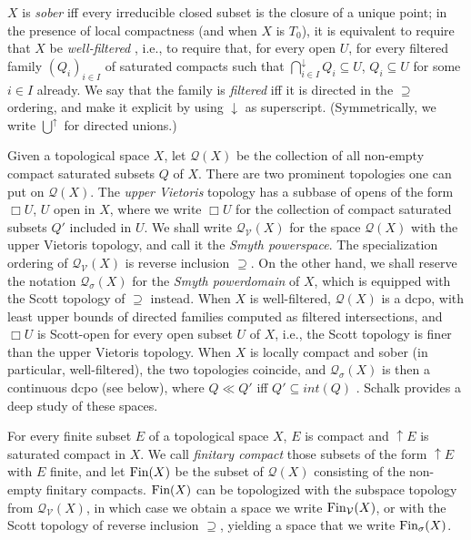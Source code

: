 \documentclass{LMCS}
\newcommand\Smyth{\mathcal Q}
\newcommand\V{{\mathcal V}}
\newcommand\SV{\Smyth_\V}
\newcommand\upc{\mathop{\uparrow}\nolimits}
\newcommand{\interior}[1]{int ({#1})} \newcommand{\biginterior}[1]{\interior{#1}}
\begin{document}
$X$ is {\em sober\/} iff every irreducible closed subset is the
closure of a unique point; in the presence of local compactness (and
when $X$ is $T_0$),
it is equivalent to require that $X$ be {\em well-filtered\/}
\cite[Theorem~II-1.21]{GHKLMS:contlatt}, i.e., to require that, for
every open $U$, for every filtered family ${(Q_i)}_{i \in I}$ of
saturated compacts such that $\bigcap_{i \in I}^\downarrow Q_i
\subseteq U$, $Q_i \subseteq U$ for some $i \in I$ already.  We say
that the family is {\em filtered\/} iff it is directed in the
$\supseteq$ ordering, and make it explicit by using
$\downarrow$ as superscript.  (Symmetrically, we write $\bigcup^\uparrow$ for
directed unions.)

Given a topological space $X$, let $\Smyth (X)$ be the collection of
all non-empty compact saturated subsets $Q$ of $X$.  There are two
prominent topologies one can put on $\Smyth (X)$.  The {\em upper
  Vietoris\/} topology has a subbase of opens of the form $\Box U$,
$U$ open in $X$, where we write $\Box U$ for the collection of compact
saturated subsets $Q'$ included in $U$.  We shall write $\SV (X)$ for
the space $\Smyth (X)$ with the upper Vietoris topology, and call it
the \emph{Smyth powerspace}.  The specialization ordering of $\SV (X)$
is reverse inclusion $\supseteq$.  On the other hand, we shall reserve
the notation $\Smyth_\sigma (X)$ for the {\em Smyth powerdomain\/} of
$X$, which is equipped with the Scott topology of $\supseteq$ instead.
When $X$ is well-filtered, $\Smyth (X)$ is a dcpo, with least upper
bounds of directed families computed as filtered intersections, and
$\Box U$ is Scott-open for every open subset $U$ of $X$, i.e., the
Scott topology is finer than the upper Vietoris topology.  When $X$ is
locally compact and sober (in particular, well-filtered), the two
topologies coincide, and $\Smyth_\sigma (X)$ is then a continuous dcpo
(see below), where $Q \ll Q'$ iff $Q' \subseteq \interior Q$
\cite[Proposition~I-1.24.2]{GHKLMS:contlatt}.  Schalk
\cite[Chapter~7]{Schalk:PhD} provides a deep study of these spaces.

For every finite subset $E$ of a topological space $X$, $E$ is compact
and $\upc E$ is saturated compact in $X$.  We call {\em finitary
  compact\/} those subsets of the form $\upc E$ with $E$ finite, and
let $\mathop{\text{Fin}} (X)$ be the subset of $\Smyth (X)$ consisting of the
non-empty finitary compacts.  $\mathop{\text{Fin}} (X)$ can be topologized with the
subspace topology from $\SV (X)$, in which case we obtain a space we
write $\Fin_\V (X)$, or with the Scott topology of reverse inclusion
$\supseteq$, yielding a space that we write $\mathop{\text{Fin}}_\sigma (X)$.
\end{document}
